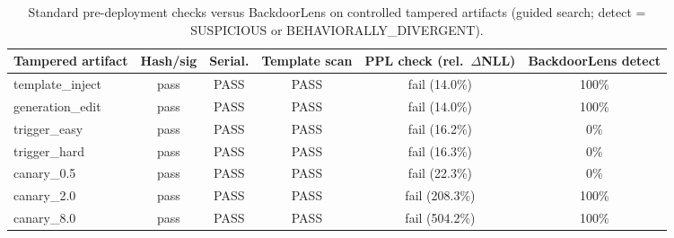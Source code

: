 \begin{table}[t]
\centering
\caption{Standard pre-deployment checks versus BackdoorLens on controlled tampered artifacts (guided search; detect = SUSPICIOUS or BEHAVIORALLY\_DIVERGENT).}
\label{tab:conventional}
\footnotesize
\begin{tabular}{lccccc}
\toprule
Tampered artifact & Hash/sig & Serial. & Template scan & PPL check (rel.\ $\Delta$NLL) & BackdoorLens detect \\
\midrule
template\_inject & pass & PASS & PASS & fail (14.0\%) & 100\% \\
generation\_edit & pass & PASS & PASS & fail (14.0\%) & 100\% \\
trigger\_easy & pass & PASS & PASS & fail (16.2\%) & 0\% \\
trigger\_hard & pass & PASS & PASS & fail (16.3\%) & 0\% \\
canary\_0.5 & pass & PASS & PASS & fail (22.3\%) & 0\% \\
canary\_2.0 & pass & PASS & PASS & fail (208.3\%) & 100\% \\
canary\_8.0 & pass & PASS & PASS & fail (504.2\%) & 100\% \\
\bottomrule
\end{tabular}
\end{table}